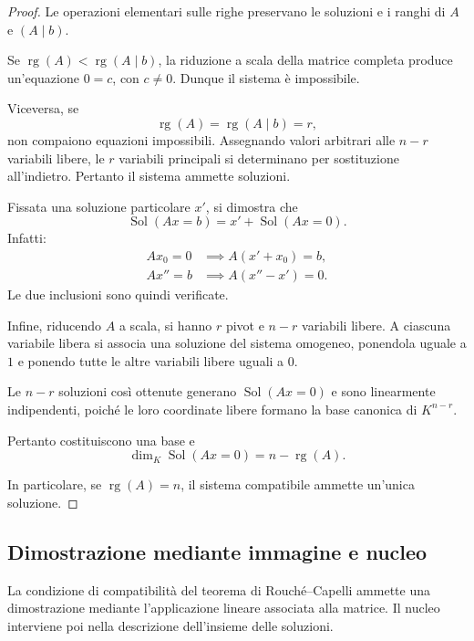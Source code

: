 \documentclass[11pt,a4paper]{article}
\theoremstyle{plain}
\theoremstyle{definition}
\theoremstyle{remark}
\begin{document}
\begin{proof}
Le operazioni elementari sulle righe preservano le soluzioni e i ranghi di \(A\) e \((A\mid b)\).

Se \(\operatorname{rg}(A)<\operatorname{rg}(A\mid b)\), la riduzione a scala della matrice completa produce un'equazione \(0=c\), con \(c\neq 0\). Dunque il sistema è impossibile.

Viceversa, se
\[
\operatorname{rg}(A)=\operatorname{rg}(A\mid b)=r,
\]
non compaiono equazioni impossibili. Assegnando valori arbitrari alle \(n-r\) variabili libere, le \(r\) variabili principali si determinano per sostituzione all'indietro. Pertanto il sistema ammette soluzioni.

Fissata una soluzione particolare \(x'\), si dimostra che
\[
\operatorname{Sol}(Ax=b)=x'+\operatorname{Sol}(Ax=0).
\]
Infatti:
\[
\begin{aligned}
Ax_0=0
&\implies A(x'+x_0)=b,\\
Ax''=b
&\implies A(x''-x')=0.
\end{aligned}
\]
Le due inclusioni sono quindi verificate.

Infine, riducendo \(A\) a scala, si hanno \(r\) pivot e \(n-r\) variabili libere. A ciascuna variabile libera si associa una soluzione del sistema omogeneo, ponendola uguale a \(1\) e ponendo tutte le altre variabili libere uguali a \(0\).

Le \(n-r\) soluzioni così ottenute generano \(\operatorname{Sol}(Ax=0)\) e sono linearmente indipendenti, poiché le loro coordinate libere formano la base canonica di \(K^{n-r}\).

Pertanto costituiscono una base e
\[
\boxed{\dim_K\operatorname{Sol}(Ax=0)
=n-\operatorname{rg}(A).}
\]

In particolare, se \(\operatorname{rg}(A)=n\), il sistema compatibile ammette un'unica soluzione.
\end{proof}




\subsection{Dimostrazione mediante immagine e nucleo}

La condizione di compatibilit\`a del teorema di Rouch\'e--Capelli ammette una dimostrazione mediante l'applicazione lineare associata alla matrice. Il nucleo interviene poi nella descrizione dell'insieme delle soluzioni.
\end{document}
